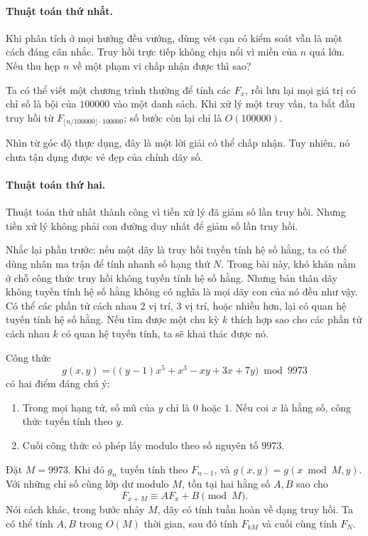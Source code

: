 \documentclass[11pt]{article}
\begin{document}
\paragraph{Thuật toán thứ nhất.}
Khi phân tích ở mọi hướng đều vướng, dùng vét cạn có kiểm soát vẫn là một cách
đáng cân nhắc. Truy hồi trực tiếp không chịu nổi vì miền của $n$ quá lớn. Nếu
thu hẹp $n$ về một phạm vi chấp nhận được thì sao?

Ta có thể viết một chương trình thường để tính các $F_x$, rồi lưu lại mọi giá
trị có chỉ số là bội của $100000$ vào một danh sách. Khi xử lý một truy vấn,
ta bắt đầu truy hồi từ $F_{\lfloor n/100000\rfloor\cdot 100000}$; số bước còn
lại chỉ là $O(100000)$.

Nhìn từ góc độ thực dụng, đây là một lời giải có thể chấp nhận. Tuy nhiên, nó
chưa tận dụng được vẻ đẹp của chính dãy số.

\paragraph{Thuật toán thứ hai.}
Thuật toán thứ nhất thành công vì tiền xử lý đã giảm số lần truy hồi. Nhưng
tiền xử lý không phải con đường duy nhất để giảm số lần truy hồi.

Nhắc lại phần trước: nếu một dãy là truy hồi tuyến tính hệ số hằng, ta có thể
dùng nhân ma trận để tính nhanh số hạng thứ $N$. Trong bài này, khó khăn nằm ở
chỗ công thức truy hồi không tuyến tính hệ số hằng. Nhưng bản thân dãy không
tuyến tính hệ số hằng không có nghĩa là mọi dãy con của nó đều như vậy. Có thể
các phần tử cách nhau $2$ vị trí, $3$ vị trí, hoặc nhiều hơn, lại có quan hệ
tuyến tính hệ số hằng. Nếu tìm được một chu kỳ $k$ thích hợp sao cho các phần
tử cách nhau $k$ có quan hệ tuyến tính, ta sẽ khai thác được nó.

Công thức
\[
  g(x,y)=\bigl((y-1)x^5+x^3-xy+3x+7y\bigr)\bmod 9973
\]
có hai điểm đáng chú ý:
\begin{enumerate}[label=\alph*)]
  \item Trong mọi hạng tử, số mũ của $y$ chỉ là $0$ hoặc $1$. Nếu coi $x$ là
  hằng số, công thức tuyến tính theo $y$.
  \item Cuối công thức có phép lấy modulo theo số nguyên tố $9973$.
\end{enumerate}

Đặt $M=9973$. Khi đó $g_n$ tuyến tính theo $F_{n-1}$, và
$g(x,y)=g(x\bmod M,y)$. Với những chỉ số cùng lớp dư modulo $M$, tồn tại hai
hằng số $A,B$ sao cho
\[
  F_{x+M}\equiv A F_x+B\pmod M.
\]
Nói cách khác, trong bước nhảy $M$, dãy có tính tuần hoàn về dạng truy hồi.
Ta có thể tính $A,B$ trong $O(M)$ thời gian, sau đó tính $F_{kM}$ và cuối cùng
tính $F_N$.
\end{document}
